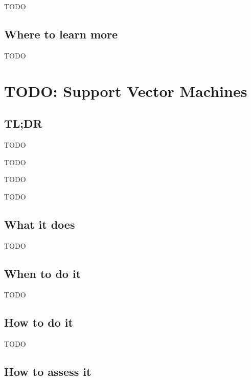 \documentclass[
]{book}
\providecommand{\tightlist}{%
  \setlength{\itemsep}{0pt}\setlength{\parskip}{0pt}}
\begin{document}
TODO

\hypertarget{where-to-learn-more-18}{%
\section{Where to learn more}\label{where-to-learn-more-18}}

TODO

\hypertarget{support-vector-machines}{%
\chapter{TODO: Support Vector Machines}\label{support-vector-machines}}

\hypertarget{tldr-19}{%
\section{TL;DR}\label{tldr-19}}

\begin{description}
\tightlist
\item[What it does]
TODO
\item[When to do it]
TODO
\item[How to do it]
TODO
\item[How to assess it]
TODO
\end{description}

\hypertarget{what-it-does-19}{%
\section{What it does}\label{what-it-does-19}}

TODO

\hypertarget{when-to-do-it-19}{%
\section{When to do it}\label{when-to-do-it-19}}

TODO

\hypertarget{how-to-do-it-19}{%
\section{How to do it}\label{how-to-do-it-19}}

TODO

\hypertarget{how-to-assess-it-19}{%
\section{How to assess it}\label{how-to-assess-it-19}}
\end{document}
